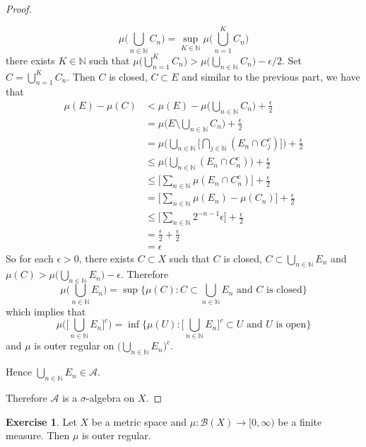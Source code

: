 \documentclass[12pt]{amsart}
\theoremstyle{definition}
\newtheorem{ex}[definition]{Exercise}
\newcommand{\ep}{\epsilon}
\newcommand{\sig}{\sigma}
\newcommand{\N}{\mathbb{N}}
\newcommand{\MA}{\mathcal{A}}
\newcommand{\MB}{\mathcal{B}}
\newcommand{\Rg}{[0,\infty)}
\begin{document}
\begin{proof}
\begin{enumerate}
\begin{itemize}
				$$\mu\bigg( \bigcup\limits_{n \in \N}C_n \bigg) = \sup\limits_{K \in \N} \mu\bigg(\bigcup\limits_{n=1}^K C_n \bigg)$$ 
				there exists $K \in \N$ such that $\mu\bigg(\bigcup\limits_{n=1}^K C_n \bigg) > \mu\bigg( \bigcup\limits_{n \in \N}C_n \bigg) - \ep/2 $. Set $C = \bigcup\limits_{n=1}^K C_n$.
				Then $C$ is closed, $C \subset E$ and similar to the previous part, we have that
				\begin{align*}
					\mu(E) - \mu(C)
					& < \mu(E) - \mu\bigg( \bigcup\limits_{n \in \N}C_n \bigg) + \frac{\ep}{2} \\
					&= \mu \bigg(E \setminus \bigcup\limits_{n \in \N}C_n   \bigg) +  \frac{\ep}{2} \\
					&= \mu \bigg( \bigcup\limits_{n \in \N} \bigg[ \bigcap_{j \in \N} (E_n \cap C_j^c)    \bigg] \bigg)  + \frac{\ep}{2} \\
					&\leq  \mu \bigg( \bigcup\limits_{n \in \N}  (E_n \cap C_n^c)  \bigg)  + \frac{\ep}{2} \\
					&\leq \bigg[ \sum_{n \in \N} \mu(E_n \cap C_n^c) \bigg] + \frac{\ep}{2}\\
					&=\bigg[ \sum_{n \in \N} \mu(E_n) - \mu(C_n) \bigg] +\frac{\ep}{2}\\
					&\leq \bigg[ \sum_{n \in \N} 2^{-n-1}\ep \bigg] + \frac{\ep}{2}\\
					&= \frac{\ep}{2} + \frac{\ep}{2} \\
					&= \ep 
				\end{align*}
				So for each $\ep >0$, there exists $C \subset X$ such that $C$ is closed, $C \subset \bigcup_{n \in \N}E_n$ and $\mu(C) > \mu \bigg( \bigcup_{n \in \N} E_n \bigg) - \ep$. Therefore 
				$$\mu \bigg( \bigcup_{n \in \N} E_n \bigg) = \sup \bigg \{ \mu(C): C \subset \bigcup_{n \in \N} E_n  \text{ and $C$ is closed} \bigg \}$$
				which implies that 
				$$\mu \bigg( \bigg[ \bigcup_{n \in \N} E_n \bigg]^c \bigg) = \inf \bigg \{ \mu(U): \bigg[ \bigcup_{n \in \N} E_n \bigg]^c \subset U  \text{ and $U$ is open} \bigg \}$$
				and $\mu$ is outer regular on $\bigg( \bigcup\limits_{n \in \N} E_n \bigg)^c$.
			\end{itemize}
		Hence $\bigcup\limits_{n \in \N} E_n \in \MA$.
		\end{enumerate}
	Therefore $\MA$ is a $\sig$-algebra on $X$.
	\end{proof}

	\begin{ex}
		Let $X$ be a metric space and $\mu: \MB(X) \rightarrow \Rg$ be a finite measure. Then $\mu$ is outer regular.
	\end{ex}
\end{document}
